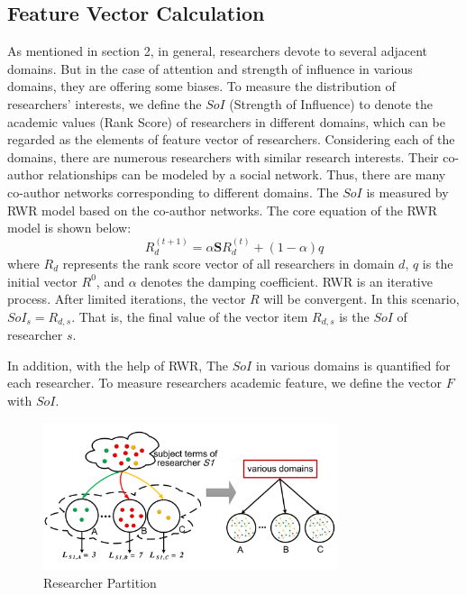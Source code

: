 \documentclass{acm_proc_article-sp}
\begin{document}
\subsection{Feature Vector Calculation}
As mentioned in section 2, in general, researchers devote to several adjacent domains. But in the case of attention and strength of influence in various domains, they are offering some biases. To measure the distribution of researchers' interests, we define the $SoI$ (Strength of Influence) to denote the academic values (Rank Score) of researchers in different domains, which can be regarded as the elements of feature vector of researchers. Considering each of the domains, there are numerous researchers with similar research interests. Their co-author relationships can be modeled by a social network. Thus, there are many co-author networks corresponding to different domains. The $SoI$ is measured by RWR model based on the co-author networks. The core equation of the RWR model is shown below:
\begin{equation}
R_{d}^{(t+1)}=\alpha \mathbf{S}R_{d}^{(t)}+(1-\alpha)q
\end{equation}
where $R_{d}$ represents the rank score vector of all researchers in domain $d$, $q$ is the initial vector $R^0$, and $\alpha$ denotes the damping coefficient. RWR is an iterative process. After limited iterations, the vector $R$ will be convergent. In this scenario, $SoI_{s}=R_{d,s}$. That is, the final value of the vector item $R_{d,s}$ is the $SoI$ of researcher $s$.


In addition, with the help of RWR, The $SoI$ in various domains is quantified for each researcher. To measure researchers academic feature, we define the vector $F$ with $SoI$.

\begin{figure}
\centering
\includegraphics [width=3.4in]{Fig5.pdf}
\caption{Researcher Partition}
\end{figure}
\end{document}
